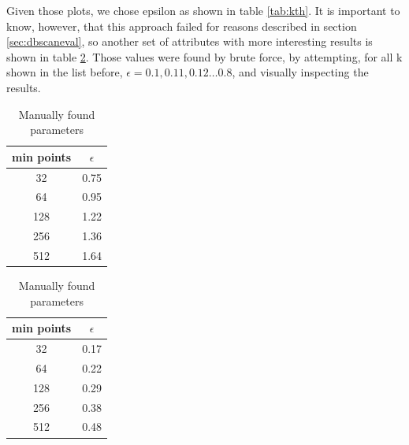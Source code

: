 \documentclass{article}
\begin{document}
	Given those plots, we chose epsilon as shown in table \ref{tab:kth}.
	It is important to know, however, that this approach failed for reasons described in section \ref{sec:dbscaneval}, so another set of attributes with more interesting results is shown in table \ref{tab:dbscan}. Those values were found by brute force, by attempting, for all k shown in the list before, $\epsilon = 0.1, 0.11, 0.12\dots 0.8$, and visually inspecting the results.\\
	
	\begin{table}
		\parbox{.45\linewidth}{
			\centering
			\begin{tabular}{|c|c|}
				\hline
				min points & $\epsilon$\\
				\hline
				\rowcolor{Gray}
				32 & 0.75 \\
				64 & 0.95 \\
				\rowcolor{Gray}
				128 & 1.22 \\
				256 & 1.36 \\
				\rowcolor{Gray}
				512 & 1.64 \\
				\hline
			\end{tabular}
			\caption{K-th nearest neighbours parameters}
			\label{tab:kth}
		}
		\hfill
		\parbox{.45\linewidth}{
			\centering
			\begin{tabular}{|c|c|}
				\hline
				min points & $\epsilon$\\
				\hline
				\rowcolor{Gray}
				32 & 0.17 \\
				64 & 0.22 \\
				\rowcolor{Gray}
				128 & 0.29 \\
				256 & 0.38 \\
				\rowcolor{Gray}
				512 & 0.48 \\
				\hline
			\end{tabular}
			\caption{Manually found parameters}
			\label{tab:dbscan}
		}
	\end{table}
	
\end{document}
